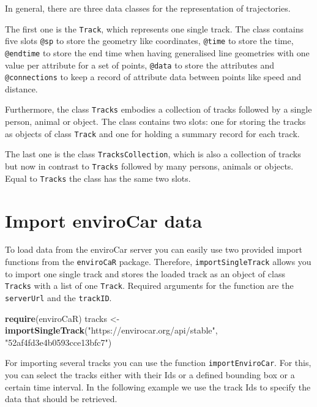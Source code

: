 \documentclass[]{article}
\newenvironment{Shaded}{\begin{snugshade}}{\end{snugshade}}
\newcommand{\KeywordTok}[1]{\textcolor[rgb]{0.13,0.29,0.53}{\textbf{{#1}}}}
\newcommand{\StringTok}[1]{\textcolor[rgb]{0.31,0.60,0.02}{{#1}}}
\newcommand{\NormalTok}[1]{{#1}}
\begin{document}
In general, there are three data classes for the representation of
trajectories.

The first one is the \texttt{Track}, which represents one single track.
The class contains five slots \texttt{@sp} to store the geometry like
coordinates, \texttt{@time} to store the time, \texttt{@endtime} to
store the end time when having generalised line geometries with one
value per attribute for a set of points, \texttt{@data} to store the
attributes and \texttt{@connections} to keep a record of attribute data
between points like speed and distance.

Furthermore, the class \texttt{Tracks} embodies a collection of tracks
followed by a single person, animal or object. The class contains two
slots: one for storing the tracks as objects of class \texttt{Track} and
one for holding a summary record for each track.

The last one is the class \texttt{TracksCollection}, which is also a
collection of tracks but now in contrast to \texttt{Tracks} followed by
many persons, animals or objects. Equal to \texttt{Tracks} the class has
the same two slots.

\section{Import enviroCar data}\label{import-envirocar-data}

To load data from the enviroCar server you can easily use two provided
import functions from the \texttt{enviroCaR} package. Therefore,
\texttt{importSingleTrack} allows you to import one single track and
stores the loaded track as an object of class \texttt{Tracks} with a
list of one \texttt{Track}. Required arguments for the function are the
\texttt{serverUrl} and the \texttt{trackID}.

\begin{Shaded}
\begin{Highlighting}[]
\KeywordTok{require}\NormalTok{(enviroCaR)}
\NormalTok{tracks <-}\StringTok{ }\KeywordTok{importSingleTrack}\NormalTok{(}\StringTok{"https://envirocar.org/api/stable"}\NormalTok{, }\StringTok{"52af4fd3e4b0593cce13bfc7"}\NormalTok{)}
\end{Highlighting}
\end{Shaded}

For importing several tracks you can use the function
\texttt{importEnviroCar}. For this, you can select the tracks either
with their Ids or a defined bounding box or a certain time interval. In
the following example we use the track Ids to specify the data that
should be retrieved.
\end{document}

